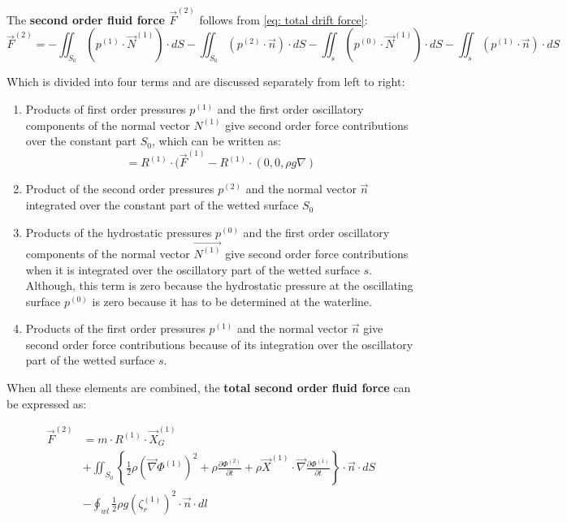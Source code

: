 The \textbf{second order fluid force $\vec{F}^(2)$} follows from \ref{eq: total drift force}:
\begin{equation}
    \vec{F}^{(2)}=-\iint_{S_{0}}\left(p^{(1)} \cdot \vec{N}^{(1)}\right) \cdot d S-\iint_{S_{0}}\left(p^{(2)} \cdot \vec{n}\right) \cdot d S -\iint_{s}\left(p^{(0)} \cdot \vec{N}^{(1)}\right) \cdot d S-\iint_{s}\left(p^{(1)} \cdot \vec{n}\right) \cdot d S
\end{equation}

Which is divided into four terms and are discussed separately from left to right:
\begin{enumerate}
    \item Products of first order pressures $p^{(1)}$ and the first order oscillatory components of the normal vector $N^{(1)}$ give second order force contributions over the constant part $S_0$, which can be written as:
    \begin{equation}
        = R^{(1)} \cdot (\vec{F}^{(1)} - R^{(1)} \cdot (0,0,\rho g \nabla)
    \end{equation}
    \item Product of the second order pressures $p^{(2)}$ and the normal vector $\vec{n}$ integrated over the constant part of the wetted surface $S_0$
    \item Products of the hydrostatic pressures $p^{(0)}$ and the first order oscillatory components of the normal vector $\vec{N^{(1)}}$ give second order force contributions when it is integrated over the oscillatory part of the wetted surface $s$. Although, this term is
    zero because the hydrostatic pressure at the oscillating surface $p^{(0)}$ is zero because it has to be determined at the waterline.
    \item Products of the first order pressures $p^{(1)}$ and the normal vector $\vec{n}$ give second order force contributions because of its integration over the oscillatory part of the wetted surface $s$. 

\end{enumerate} 

When all these elements are combined, the \textbf{total second order fluid force} can be expressed as:

\begin{equation}
\begin{aligned}
\vec{F}^{(2)} &= m \cdot R^{(1)} \cdot \vec{X}_{G}^{(1)} \\
&+\iint_{S_{0}}\left\{\frac{1}{2} \rho\left(\vec{\nabla} \Phi^{(1)}\right)^{2}+\rho \frac{\partial \Phi^{(2)}}{\partial t}+\rho \vec{X}^{(1)} \cdot \vec{\nabla} \frac{\partial \Phi^{(1)}}{\partial t}\right\} \cdot \vec{n} \cdot d S \\
&-\oint_{w l} \frac{1}{2} \rho g\left(\zeta_{r}^{(1)}\right)^{2} \cdot \vec{n} \cdot d l
\end{aligned}
\end{equation}




